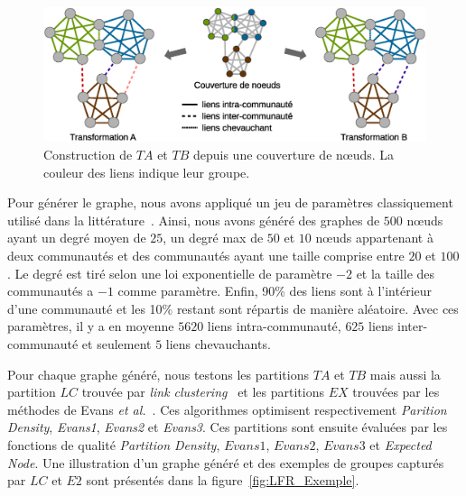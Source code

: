 \begin{figure}
\centering
\includegraphics[width=0.9\linewidth]{img/ExpectedNodes/Example/GroundTruthTransformation}
\caption{Construction de $TA$ et $TB$ depuis une couverture de n\oe uds.
La couleur des liens indique leur groupe.}
\label{fig:Trans}
\end{figure}

Pour générer le graphe, nous avons appliqué un jeu de paramètres classiquement utilisé dans la littérature~\cite{Fortunato2010}.
Ainsi, nous avons généré des graphes de $500$ n\oe uds ayant un degré moyen de $25$, un degré max de $50$ et $10$ n\oe uds appartenant à deux communautés et des communautés ayant une taille comprise entre $20$ et $100$.
Le degré est tiré selon une loi exponentielle de paramètre $-2$ et la taille des communautés a $-1$ comme paramètre.
Enfin, 90\% des liens sont à l'intérieur d'une communauté et les 10\% restant sont répartis de manière aléatoire.
Avec ces paramètres, il y a en moyenne $5620$ liens intra-communauté, $625$ liens inter-communauté et seulement $5$ liens chevauchants.

Pour chaque graphe généré, nous testons les partitions $TA$ et $TB$ mais aussi la partition $LC$ trouvée par \textit{link clustering}~\cite{Ahn2010a} et les partitions $EX$ trouvées par les méthodes de Evans \textit{et al.}~\cite{Evans2009}.
Ces algorithmes optimisent respectivement \emph{Parition Density}, \emph{Evans1}, \emph{Evans2} et \emph{Evans3}.
Ces partitions sont ensuite évaluées par les fonctions de qualité \emph{Partition Density}, $Evans1$, $Evans2$, $Evans3$ et \emph{Expected Node}.
Une illustration d'un graphe généré et des exemples de groupes capturés par $LC$ et $E2$ sont présentés dans la figure~\ref{fig:LFR_Exemple}.

